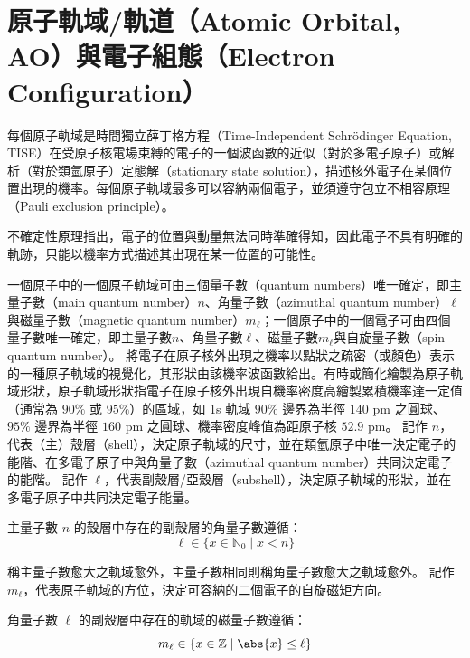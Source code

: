 \documentclass[a4paper,12pt]{report}
\begin{document}
\section{原子軌域/軌道（Atomic Orbital, AO）與電子組態（Electron Configuration）}
每個原子軌域是時間獨立薛丁格方程（Time-Independent Schrödinger Equation, TISE）在受原子核電場束縛的電子的一個波函數的近似（對於多電子原子）或解析（對於類氫原子）定態解（stationary state solution），描述核外電子在某個位置出現的機率。每個原子軌域最多可以容納兩個電子，並須遵守包立不相容原理（Pauli exclusion principle）。

不確定性原理指出，電子的位置與動量無法同時準確得知，因此電子不具有明確的軌跡，只能以機率方式描述其出現在某一位置的可能性。

一個原子中的一個原子軌域可由三個量子數（quantum numbers）唯一確定，即主量子數（main quantum number）$n$、角量子數（azimuthal quantum number）$\ell$與磁量子數（magnetic quantum number）$m_\ell$；一個原子中的一個電子可由四個量子數唯一確定，即主量子數$n$、角量子數$\ell$、磁量子數$m_\ell$與自旋量子數（spin quantum number）。
將電子在原子核外出現之機率以點狀之疏密（或顏色）表示的一種原子軌域的視覺化，其形狀由該機率波函數給出。有時或簡化繪製為原子軌域形狀，原子軌域形狀指電子在原子核外出現自機率密度高繪製累積機率達一定值（通常為 $90\%$ 或 $95\%$）的區域，如 1s 軌域 $90\%$ 邊界為半徑 $140$ pm 之圓球、$95\%$ 邊界為半徑 $160$ pm 之圓球、機率密度峰值為距原子核 $52.9$ pm。
記作 $n$，代表（主）殼層（shell），決定原子軌域的尺寸，並在類氫原子中唯一決定電子的能階、在多電子原子中與角量子數（azimuthal quantum number）共同決定電子的能階。
記作 $\ell$，代表副殼層/亞殼層（subshell），決定原子軌域的形狀，並在多電子原子中共同決定電子能量。

主量子數 $n$ 的殼層中存在的副殼層的角量子數遵循：
\[\ell\in\{x\in\mathbb{N}_0\mid x<n\}\]

稱主量子數愈大之軌域愈外，主量子數相同則稱角量子數愈大之軌域愈外。
記作 $m_\ell$，代表原子軌域的方位，決定可容納的二個電子的自旋磁矩方向。

角量子數 $\ell$ 的副殼層中存在的軌域的磁量子數遵循：
\[m_\ell\in\{x\in\mathbb{Z}\mid\abs{x}\leq\ell\}\]
\end{document}
